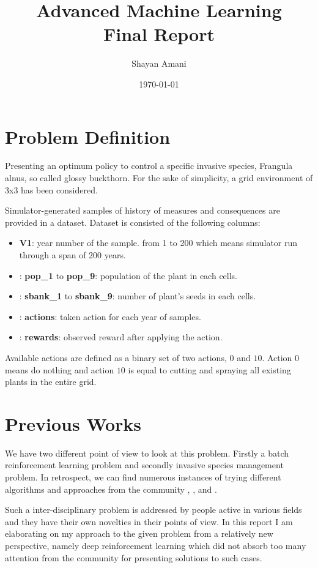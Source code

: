 \documentclass[12pt]{report}
\title{Advanced Machine Learning\\Final Report}
\author{Shayan Amani}
\date{\today}
\begin{document}
\maketitle

\chapter{Problem Definition}
Presenting an optimum policy \cite{Sutton1998} to control a specific invasive species, Frangula alnus, so called glossy buckthorn. For the sake of simplicity, a grid environment of 3x3 has been considered. 

Simulator-generated samples of history of measures and consequences are provided in a dataset. Dataset is consisted of the following columns:
\begin{itemize}
    \item \textbf{V1}: year number of the sample. from 1 to 200 which means simulator run through a span of 200 years.
    \item: \textbf{pop\_1} to \textbf{pop\_9}: population of the plant in each cells.
    \item: \textbf{sbank\_1} to \textbf{sbank\_9}: number of plant's seeds in each cells.
    \item: \textbf{actions}: taken action for each year of samples.
    \item: \textbf{rewards}: observed reward after applying the action.
\end{itemize}

Available actions are defined as a binary set of two actions, $0$ and $10$. Action $0$ means do nothing and action $10$ is equal to cutting and spraying all existing plants in the entire grid.


\chapter{Previous Works}
We have two different point of view to look at this problem. Firstly a batch reinforcement learning problem and secondly invasive species management problem. In retrospect, we can find numerous instances of trying different algorithms and approaches from the community \cite{Phillips2006}, \cite{Phillips2004}, and \cite{Warton2010}.

Such a inter-disciplinary problem is addressed by people active in various fields and they have their own novelties in their points of view. In this report I am elaborating on my approach to the given problem from a relatively new perspective, namely deep reinforcement learning which did not absorb too many attention from the community for presenting solutions to such cases.
\end{document}

